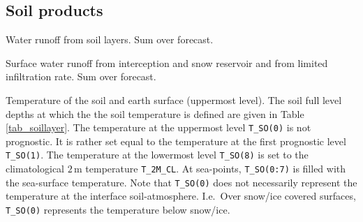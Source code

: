 \subsection{Soil products}
\begin{description}[leftmargin=3.0cm,style=sameline]
 \item [RUNOFF\_G] Water runoff from soil layers. Sum over forecast.

 \item [RUNOFF\_S] Surface water runoff from interception and snow reservoir and from limited infiltration rate. Sum over forecast.

 \item [T\_SO] Temperature of the soil and earth surface (uppermost level). The soil full level depths at which the 
the soil temperature is defined are given in Table \ref{tab_soillayer}. The temperature at the uppermost level \texttt{T\_SO(0)} 
is not prognostic. It is rather set equal to the temperature at the first prognostic level \texttt{T\_SO(1)}. The temperature 
at the lowermost level \texttt{T\_SO(8)} is set to the climatological $2\,\mathrm{m}$ temperature \texttt{T\_2M\_CL}. At 
sea-points, \texttt{T\_SO(0:7)} is filled with the sea-surface temperature. Note that \texttt{T\_SO(0)} does not necessarily 
represent the temperature at the interface soil-atmosphere. I.e.\ Over snow/ice covered surfaces, \texttt{T\_SO(0)} 
represents the temperature below snow/ice.
\end{description}
